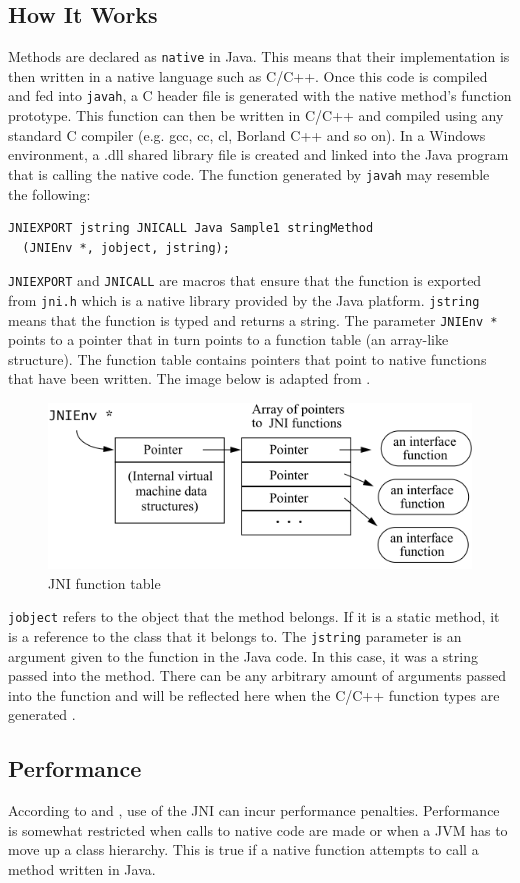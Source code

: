 \documentclass[12pt,a4paper,oneside]{article}
\def\code#1{\texttt{#1}}
\begin{document}
\begin{spacing}{1.4}
\subsection{How It Works}
Methods are declared as \code{native} in Java. This means that their implementation is then written in a native language such as C/C++. Once this code is compiled and fed into \code{javah}, a C header file is generated with the native method's function prototype. This function can then be written in C/C++ and compiled using any standard C compiler (e.g. gcc, cc, cl, Borland C++ and so on). In a Windows environment, a .dll shared library file is created and linked into the Java program that is calling the native code. The function generated by \code{javah} may resemble the following:
\begin{verbatim}
JNIEXPORT jstring JNICALL Java Sample1 stringMethod
  (JNIEnv *, jobject, jstring);
\end{verbatim}
\code{JNIEXPORT} and \code{JNICALL} are macros that ensure that the function is exported from \code{jni.h} which is a native library provided by the Java platform. \code{jstring} means that the function is typed and returns a string. The parameter \code{JNIEnv *} points to a pointer that in turn points to a function table (an array-like structure). The function table contains pointers that point to native functions that have been written. The image below is adapted from \cite{LiangJNISpecification}.
\begin{figure}[H]
\includegraphics[width=12cm]{jni_function_table}
\caption{JNI function table}
\end{figure}
\code{jobject} refers to the object that the method belongs. If it is a static method, it is a reference to the class that it belongs to. The \code{jstring} parameter is an argument given to the function in the Java code. In this case, it was a string passed into the method. There can be any arbitrary amount of arguments passed into the function and will be reflected here when the C/C++ function types are generated \citep{LiangJNISpecification}.
\subsection{Performance}
According to \cite{IBM2009} and \cite{WellsIPCMultiProc}, use of the JNI can incur performance penalties. Performance is somewhat restricted when calls to native code are made or when a JVM has to move up a class hierarchy. This is true if a native function attempts to call a method written in Java.
\end{spacing} 
\end{document}
